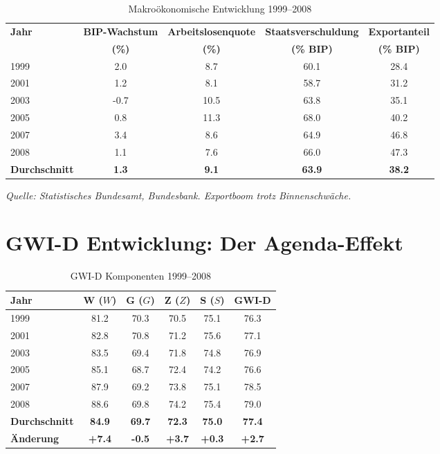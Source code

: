 \begin{table}[ht]
    \centering
    \caption{Makroökonomische Entwicklung 1999–2008}
    \label{tab:makro_agenda}
    \begin{tabular}{lcccc}
        \toprule
        \textbf{Jahr} & \textbf{BIP-Wachstum} & \textbf{Arbeitslosenquote} & \textbf{Staatsverschuldung} & \textbf{Exportanteil} \\
        & \textbf{(\%)} & \textbf{(\%)} & \textbf{(\% BIP)} & \textbf{(\% BIP)} \\
        \midrule
        1999 & 2.0 & 8.7 & 60.1 & 28.4 \\
        2001 & 1.2 & 8.1 & 58.7 & 31.2 \\
        2003 & -0.7 & 10.5 & 63.8 & 35.1 \\
        2005 & 0.8 & 11.3 & 68.0 & 40.2 \\
        2007 & 3.4 & 8.6 & 64.9 & 46.8 \\
        2008 & 1.1 & 7.6 & 66.0 & 47.3 \\
        \midrule
        \textbf{Durchschnitt} & \textbf{1.3} & \textbf{9.1} & \textbf{63.9} & \textbf{38.2} \\
        \bottomrule
    \end{tabular}
\end{table}

\begin{flushleft}
\footnotesize{\textit{Quelle: Statistisches Bundesamt, Bundesbank. Exportboom trotz Binnenschwäche.}}
\end{flushleft}

\section{GWI-D Entwicklung: Der Agenda-Effekt}

\begin{table}[ht]
    \centering
    \caption{GWI-D Komponenten 1999–2008}
    \label{tab:gwi_agenda}
    \begin{tabular}{lccccc}
        \toprule
        \textbf{Jahr} & \textbf{W (\(W\))} & \textbf{G (\(G\))} & \textbf{Z (\(Z\))} & \textbf{S (\(S\))} & \textbf{GWI-D} \\
        \midrule
        1999 & 81.2 & 70.3 & 70.5 & 75.1 & 76.3 \\
        2001 & 82.8 & 70.8 & 71.2 & 75.6 & 77.1 \\
        2003 & 83.5 & 69.4 & 71.8 & 74.8 & 76.9 \\
        2005 & 85.1 & 68.7 & 72.4 & 74.2 & 76.6 \\
        2007 & 87.9 & 69.2 & 73.8 & 75.1 & 78.5 \\
        2008 & 88.6 & 69.8 & 74.2 & 75.4 & 79.0 \\
        \midrule
        \textbf{Durchschnitt} & \textbf{84.9} & \textbf{69.7} & \textbf{72.3} & \textbf{75.0} & \textbf{77.4} \\
        \textbf{Änderung} & \textbf{+7.4} & \textbf{-0.5} & \textbf{+3.7} & \textbf{+0.3} & \textbf{+2.7} \\
        \bottomrule
    \end{tabular}
\end{table}

